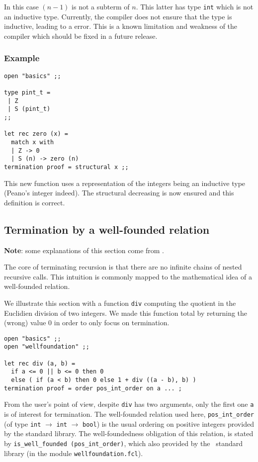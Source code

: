 In this case $(n - 1)$ is not a subterm of $n$. This latter has type
{\tt int} which is not an inductive type. Currently, the compiler does not
ensure that the type is inductive, leading to a {\coq} error. This is a
known limitation and weakness of the compiler which should be fixed in a
future release.

\subsubsection{Example}

\noindent
{\scriptsize
\begin{lstlisting}
open "basics" ;;

type pint_t =
 | Z
 | S (pint_t)
;;

let rec zero (x) =
  match x with
  | Z -> 0
  | S (n) -> zero (n)
termination proof = structural x ;;
\end{lstlisting}
}

This new function uses a representation of the integers being an inductive
type (Peano's integer indeed). The structural decreasing is now ensured and
this definition is correct.


\subsection{Termination by a well-founded relation}
{\bf Note}: some explanations of this section come from
\cite{Dubois-Pessaux-termproofs-TFP2015}.

\medskip
The core of terminating recursion is that there are no infinite
chains of nested recursive calls. This intuition is commonly mapped to
the mathematical idea of a well-founded relation.

\medskip
We illustrate this section with a function {\tt div} computing the quotient
in the Euclidien division of two integers. We made this function total by
returning the (wrong) value 0 in order to only focus on termination.

\noindent
{\scriptsize
\begin{lstlisting}
open "basics" ;;
open "wellfoundation" ;;

let rec div (a, b) =
  if a <= 0 || b <= 0 then 0
  else ( if (a < b) then 0 else 1 + div ((a - b), b) )
termination proof = order pos_int_order on a ... ;
\end{lstlisting}
}

From the user's point of view, despite {\tt div} has two arguments,
only the first one {\tt a} is of interest for termination. The
well-founded relation used here, {\tt pos\_int\_order}
(of type {\tt int} $\rightarrow$ {\tt int}  $\rightarrow$ {\tt bool}) is the
usual ordering on positive integers provided by the standard library.
The well-foundedness obligation of this relation, is stated by
\lstinline"is_well_founded (pos_int_order)", which also provided by the
\focal\ standard library (in the module {\tt wellfoundation.fcl}).

